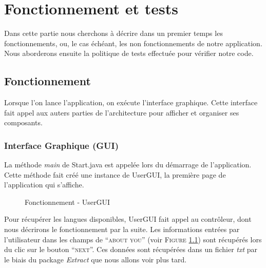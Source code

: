 \chapter{Fonctionnement et tests}

Dans cette partie nous cherchons à décrire dans un premier temps les fonctionnements, ou, le cas échéant, les non fonctionnements de notre application.  Nous aborderons ensuite la politique de tests effectuée pour vérifier notre code. 

\section{Fonctionnement}

Lorsque l'on lance l'application, on exécute l'interface graphique. Cette interface fait appel aux auters parties de l'architecture pour afficher et organiser ses composants.

\subsection{Interface Graphique (GUI)}

La méthode \textit{main} de Start.java est appelée lors du démarrage de l'application. Cette méthode fait créé une instance de UserGUI, la première page de l'application qui s'affiche.

\begin{figure}[!ht]
\begin{center}
  \caption{Fonctionnement - UserGUI}
  \label{UserGUI} 
\end{center}
\end{figure}

Pour récupérer les langues disponibles, UserGUI fait appel au contrôleur, dont nous décrirons le fonctionnement par la suite.
Les informations entrées par l'utilisateur dans les champs de ``\textsc{about you}'' (voir \textsc{Figure} \ref{UserGUI}) sont récupérés lors du clic sur le bouton ``\textsc{next}''. Ces données sont récupérées dans un fichier \textit{txt} par le biais du package \textit{Extract} que nous allons voir plus tard.

